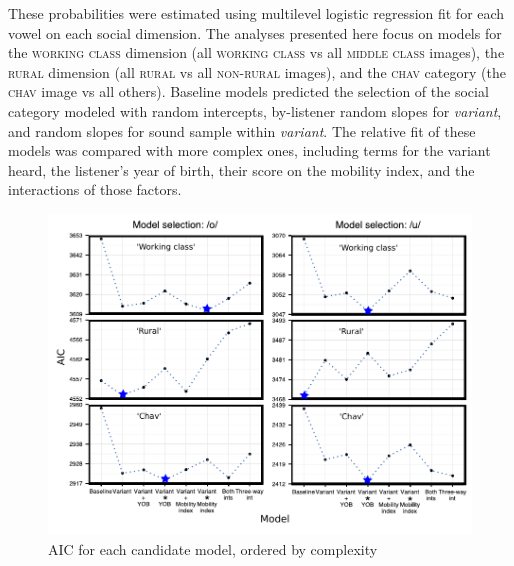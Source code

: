 \documentclass[PWPL]{article}
\begin{document}
These probabilities were estimated using multilevel logistic regression fit for each vowel on each social dimension. The analyses presented here focus on models for the \textsc{working class} dimension (all \textsc{working class} vs all \textsc{middle class} images), the \textsc{rural} dimension (all \textsc{rural} vs all \textsc{non-rural} images), and the \textsc{chav} category (the \textsc{chav} image vs all others).  Baseline models predicted the selection of the social category modeled with random intercepts, by-listener random slopes for \textit{variant}, and random slopes for sound sample within \textit{variant}.
The relative fit of these models was compared with more complex ones, including terms for the variant heard, the listener's year of birth, their score on the mobility index, and the interactions of those factors.
\newpage
\begin{figure}[!htpb]
\caption{AIC for each candidate model, ordered by complexity}
\includegraphics[scale=0.9]{model_comparison.pdf}
\end{figure}
\vspace{-.65cm}
\end{document}
